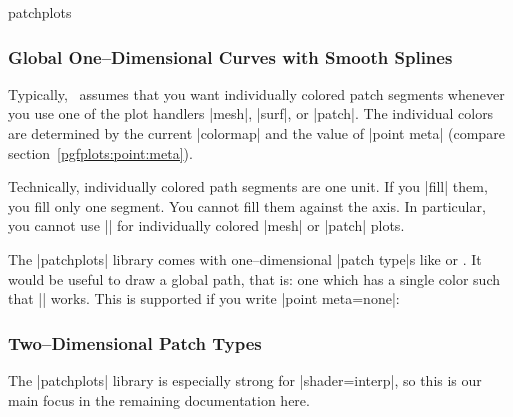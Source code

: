 {\begin{pgfplotslibrary}{patchplots}
\subsubsection{Global One--Dimensional Curves with Smooth Splines}
Typically, \PGFPlots\ assumes that you want individually colored patch segments whenever you use one of the plot handlers  |mesh|, |surf|, or |patch|. The individual colors are determined by the current |colormap| and the value of |point meta| (compare section~\ref{pgfplots:point:meta}).

Technically, individually colored path segments are one unit. If you |fill| them, you fill only one segment. You cannot fill them against the axis. In particular, you cannot use |\closedcycle| for individually colored |mesh| or |patch| plots.
%
%
%

The |patchplots| library comes with one--dimensional |patch type|s like  or . It would be useful to draw a global path, that is: one which has a single color such that |\closedcycle| works. This is supported if you write |point meta=none|:
%
%
%
\begin{codeexample}[]
\end{codeexample}

\subsubsection{Two--Dimensional Patch Types}
	The |patchplots| library is especially strong for |shader=interp|, so this is our main focus in the remaining documentation here.


\end{pgfplotslibrary}}
